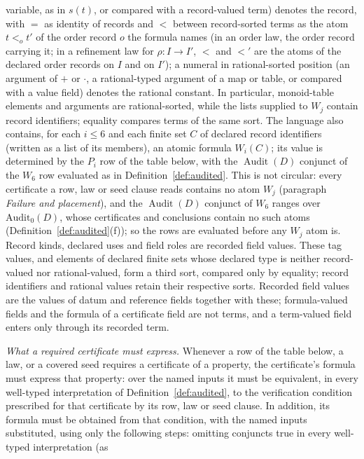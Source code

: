 \documentclass[11pt]{article}
\theoremstyle{definition}
\newcommand{\Audit}[1]{\ensuremath{\operatorname{Audit}\!\left(#1\right)}}
\begin{document}
variable, as in \(s(t)\), or compared with a record-valued term)
denotes the record, with \(=\) as identity of records and \(<\) between record-sorted terms as the atom \(t<_o t'\) of the order
record \(o\) the formula names (in an order law, the order record carrying it; in a refinement law for
\(\rho:I\to I'\), \(<\) and \(<'\) are the atoms of the declared order records on
\(I\) and on \(I'\)); a numeral in rational-sorted position (an argument of
\(+\) or \(\cdot\), a rational-typed argument of a map or table, or compared
with a value field) denotes the rational constant. In particular, monoid-table
elements and arguments are rational-sorted, while the lists supplied to
\(W_j\) contain record identifiers; equality compares terms of the same sort. The language also
contains, for each \(i\le 6\) and each finite set \(C\) of declared record
identifiers (written as a list of its members), an atomic formula \(W_i(C)\); its value is determined by the \(P_i\)
row of the table below, with the \(\Audit{D}\) conjunct of the \(W_6\) row
evaluated as in Definition~\ref{def:audited}. This is not circular: every certificate a row, law or seed clause reads contains no atom \(W_j\) (paragraph \emph{Failure and placement}), and the \(\Audit{D}\) conjunct of \(W_6\) ranges over \(\mathrm{Audit}_0(D)\), whose certificates and conclusions contain no such atoms (Definition~\ref{def:audited}(f)); so the rows are evaluated before any \(W_j\) atom is. Record kinds, declared uses and
field roles are recorded field values. These tag values, and elements of declared finite sets whose declared type is neither record-valued nor rational-valued, form a third sort, compared only by equality; record identifiers and rational values retain their respective sorts. Recorded field values are the values of datum and reference fields together with these; formula-valued fields and the formula of a certificate field are not terms, and a term-valued field enters only through its recorded term.
\par\emph{What a required certificate must express.} Whenever a row of
the table below, a law, or a covered seed requires a certificate of a
property, the certificate's formula must express that property: over the named inputs
it must be equivalent, in every well-typed interpretation of
Definition~\ref{def:audited}, to the verification condition prescribed for
that certificate by its row, law or seed clause. In addition, its formula must be
obtained from that condition, with the named inputs substituted, using only the
following steps: omitting conjuncts true in every well-typed interpretation (as
\end{document}
